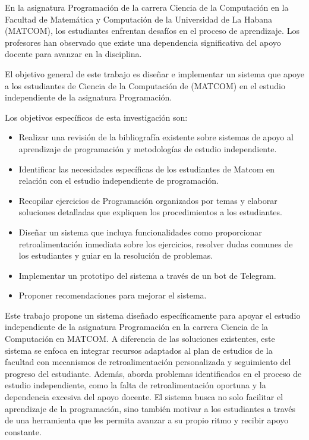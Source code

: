 \documentclass{article}
\begin{document}
En la asignatura Programación de la carrera Ciencia de la Computación en la Facultad de Matemática y Computación de la Universidad de La Habana (\mbox{MATCOM}), los estudiantes enfrentan desafíos en el proceso de aprendizaje. Los profesores han observado que existe una dependencia significativa del apoyo docente para avanzar en la disciplina.

El objetivo general de este trabajo es diseñar e implementar un sistema que apoye a los estudiantes de Ciencia de la Computación de (\mbox{MATCOM}) en el estudio independiente de la asignatura Programación.

Los objetivos específicos de esta investigación son:
\begin{itemize}
    \item Realizar una revisión de la bibliografía existente sobre sistemas de apoyo al aprendizaje de programación y metodologías de estudio independiente.
    \item Identificar las necesidades específicas de los estudiantes de Matcom en relación con el estudio independiente de programación.
    \item Recopilar ejercicios de Programación organizados por temas y elaborar soluciones detalladas que expliquen los procedimientos a los estudiantes.
    \item Diseñar un sistema que incluya funcionalidades como proporcionar retroalimentación inmediata sobre los ejercicios, resolver dudas comunes de los estudiantes y guiar en la resolución de problemas.
    \item Implementar un prototipo del sistema a través de un bot de Telegram.
    \item Proponer recomendaciones para mejorar el sistema.
\end{itemize}

Este trabajo propone un sistema diseñado específicamente para apoyar el estudio independiente de la asignatura Programación en la carrera Ciencia de la Computación en \mbox{MATCOM}. A diferencia de las soluciones existentes, este sistema se enfoca en integrar recursos adaptados al plan de estudios de la facultad con mecanismos de retroalimentación personalizada y seguimiento del progreso del estudiante. Además, aborda problemas identificados en el proceso de estudio independiente, como la falta de retroalimentación oportuna y la dependencia excesiva del apoyo docente. El sistema busca no solo facilitar el aprendizaje de la programación, sino también motivar a los estudiantes a través de una herramienta que les permita avanzar a su propio ritmo y recibir apoyo constante.
\end{document}
